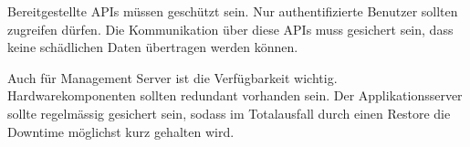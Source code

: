 Bereitgestellte APIs müssen geschützt sein. Nur authentifizierte Benutzer sollten zugreifen dürfen. Die Kommunikation über diese APIs muss gesichert sein, dass keine schädlichen Daten übertragen werden können. 

Auch für Management Server ist die Verfügbarkeit wichtig. Hardwarekomponenten sollten redundant vorhanden sein. Der Applikationsserver sollte regelmässig gesichert sein, sodass im Totalausfall durch einen Restore die Downtime möglichst kurz gehalten wird.





